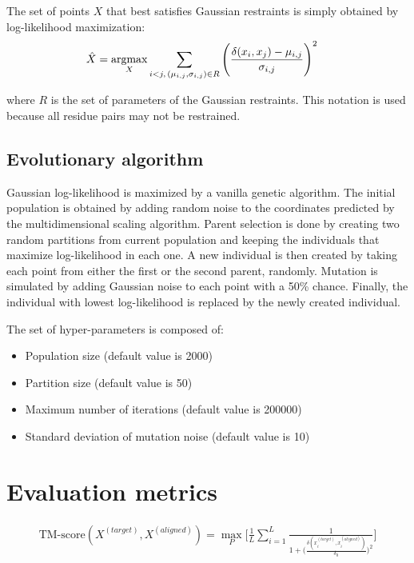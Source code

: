         The set of points $X$ that best satisfies Gaussian restraints is simply
        obtained by log-likelihood maximization:
        \begin{align}
            \hat{X} & = \operatorname*{argmax}_{X} \sum\limits_{i < j ,\, (\mu_{i,j}, \sigma_{i,j}) \in R}
                \Bigg(\frac{\delta(x_i, x_j) - \mu_{i,j}}{\sigma_{i,j}}\Bigg)^2
        \end{align}

        where $R$ is the set of parameters of the Gaussian restraints. This notation is used
        because all residue pairs may not be restrained.

    \subsection{Evolutionary algorithm}

        Gaussian log-likelihood is maximized by a vanilla genetic algorithm.
        The initial population is obtained by adding random noise to the coordinates
        predicted by the multidimensional scaling algorithm.
        Parent selection is done by creating two random partitions from current population
        and keeping the individuals that maximize log-likelihood in each one.
        A new individual is then created by taking each point from either the first
        or the second parent, randomly. Mutation is simulated by adding Gaussian noise
        to each point with a 50\% chance.
        Finally, the individual with lowest log-likelihood is replaced by the
        newly created individual.

        The set of hyper-parameters is composed of:
        \begin{itemize}
            \item Population size (default value is 2000)
            \item Partition size (default value is 50)
            \item Maximum number of iterations (default value is 200000)
            \item Standard deviation of mutation noise (default value is 10)
        \end{itemize}

    \section{Evaluation metrics}

    \begin{align}
        \text{TM-score}(X^{(target)}, X^{(aligned)}) = \max_P \Bigg[ \frac{1}{L} \sum\limits_{i=1}^L
            \frac{1}{1 + \Big(\frac{\delta(x_i^{(target)}, x_i^{(aligned)})}{\delta_0}\Big)^2} \Bigg]
    \end{align}

